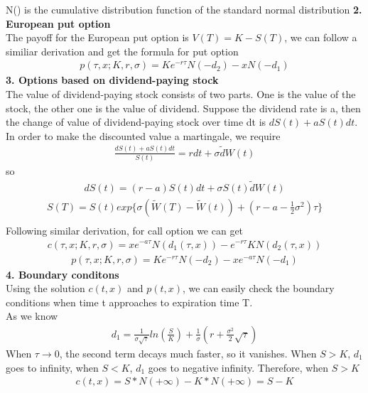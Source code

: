 \documentclass[a4paper]{article}
\begin{document}
N() is the cumulative distribution function of the standard normal distribution
{\bf 2. European put option}\\
The payoff for the European put option is $V(T) = K - S(T)$, we can follow a similiar derivation and get the formula for put option
\begin{align*}
	p(\tau,x; K, r, \sigma) = Ke^{-r\tau}N(-d_2)-xN(-d_1)
\end{align*}
{\bf 3. Options based on dividend-paying stock}\\
The value of dividend-paying stock consists of two parts. One is the value of the stock, the other one is the value of dividend. Suppose the dividend rate is a, then the change of value of dividend-paying stock over time dt is $dS(t) + aS(t)dt$. In order to make the discounted value a martingale, we require 
\begin{align*}
	\frac{dS(t) + aS(t)dt}{S(t)} = rdt + \sigma \tilde dW(t)
\end{align*}
so
\begin{align*}
	dS(t) = (r-a) S(t)dt + \sigma S(t) \tilde dW(t)
\end{align*}
\begin{align*}
	S(T) = S(t) exp\{\sigma(\tilde W(T) -\tilde W(t)) + (r - a - \frac{1}{2} \sigma^2) \tau\} \\
\end{align*}
Following similar derivation, for call option we can get
\begin{align*}
	c(\tau,x; K, r, \sigma) = xe^{-a\tau} N(d_1(\tau,x)) - e^{-r\tau} K N(d_2(\tau,x))
\end{align*}
\begin{align*}
	p(\tau,x; K, r, \sigma) = Ke^{-r\tau} N(-d_2)-xe^{-a \tau}N(-d_1)
\end{align*}
{\bf 4. Boundary conditons}\\
Using the solution $c(t,x)$ and $p(t,x)$, we can easily check the boundary conditions when
time t approaches to expiration time T.\\
As we know
\begin{align*}
	d_1 = \frac{1}{\sigma \sqrt{\tau}}ln(\frac{S}{K}) 
	+ \frac{1}{\sigma}(r+\frac{\sigma^2}{2}\sqrt{\tau})
\end{align*}
When $\tau \to 0$, the second term decays much faster, so it vanishes. When $S>K$, $d_1$ goes to infinity, when $S<K$, $d_1$ goes to negative infinity.
Therefore, when $S>K$
\begin{align*}
	c(t,x) = S*N(+\infty) - K*N(+\infty) = S-K
\end{align*}
\end{document}
